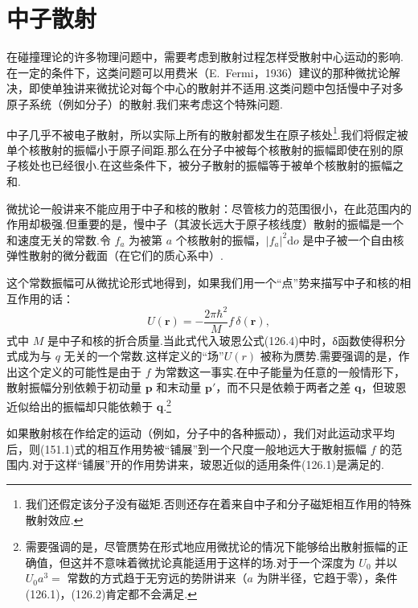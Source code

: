 \section{中子散射}

在碰撞理论的许多物理问题中，需要考虑到散射过程怎样受散射中心运动的影响.在一定的条件下，这类问题可以用费米（E.~Fermi，1936）建议的那种微扰论解决，即使单独讲来微扰论对每个中心的散射并不适用.这类问题中包括慢中子对多原子系统（例如分子）的散射.我们来考虑这个特殊问题.

中子几乎不被电子散射，所以实际上所有的散射都发生在原子核处\footnote{我们还假定该分子没有磁矩.否则还存在着来自中子和分子磁矩相互作用的特殊散射效应.}.我们将假定被单个核散射的振幅小于原子间距.那么在分子中被每个核散射的振幅即使在别的原子核处也已经很小.在这些条件下，被分子散射的振幅等于被单个核散射的振幅之和.

微扰论一般讲来不能应用于中子和核的散射：尽管核力的范围很小，在此范围内的作用却极强.但重要的是，慢中子（其波长远大于原子核线度）散射的振幅是一个和速度无关的常数.令 $f_a$ 为被第 $a$ 个核散射的振幅，$|f_a|^2\mathrm{d}o$ 是中子被一个自由核弹性散射的微分截面（在它们的质心系中）.

这个常数振幅可从微扰论形式地得到，如果我们用一个“点”势来描写中子和核的相互作用的话：
\begin{equation}
  U(\boldsymbol{r})=-\frac{2\pi\hbar^2}{M}f\,\delta(\boldsymbol{r}),
\end{equation}
式中 $M$ 是中子和核的折合质量.当此式代入玻恩公式(126.4)中时，δ函数使得积分式成为与 $q$ 无关的一个常数.这样定义的“场”$U(r)$ 被称为赝势.需要强调的是，作出这个定义的可能性是由于 $f$ 为常数这一事实.在中子能量为任意的一般情形下，散射振幅分别依赖于初动量 $\boldsymbol{p}$ 和末动量 $\boldsymbol{p}'$，而不只是依赖于两者之差 $\boldsymbol{q}$，但玻恩近似给出的振幅却只能依赖于 $\boldsymbol{q}$.\footnote{需要强调的是，尽管赝势在形式地应用微扰论的情况下能够给出散射振幅的正确值，但这并不意味着微扰论真能适用于这样的场.对于一个深度为 $U_0$ 并以 $U_0a^3=$ 常数的方式趋于无穷远的势阱讲来（$a$ 为阱半径，它趋于零），条件(126.1)，(126.2)肯定都不会满足.}

如果散射核在作给定的运动（例如，分子中的各种振动），我们对此运动求平均后，则(151.1)式的相互作用势被“铺展”到一个尺度一般地远大于散射振幅 $f$ 的范围内.对于这样“铺展”开的作用势讲来，玻恩近似的适用条件(126.1)是满足的.

